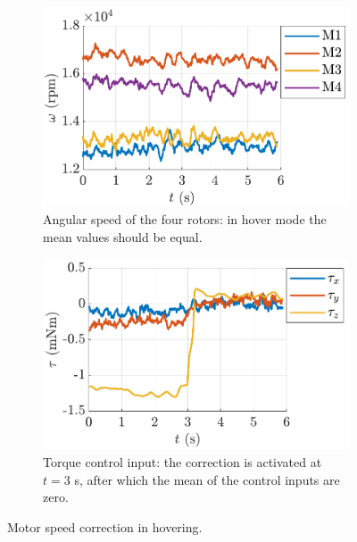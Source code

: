 \begin{figure}[!h]
  \centering
  \begin{subfigure}[t]{.48\textwidth}
    \centering
    \includegraphics[width=\linewidth]{Fig/motor_offset_2.pdf}
  \caption{Angular speed of the four rotors: in hover mode the mean values should be equal. }\label{fig:motors2}
  \end{subfigure}
  \hspace{0.3cm}
  \begin{subfigure}[t]{.48\textwidth}
    \centering
    \includegraphics[width=\linewidth]{Fig/motor_offset.pdf}
  \caption{Torque control input: the correction is activated at $t=3$ s, after which the mean of the control inputs are zero.}\label{fig:motors}
  \end{subfigure}%
  \caption{Motor speed correction in hovering.}
  \label{fig:motor}
  \end{figure}
\newpage
